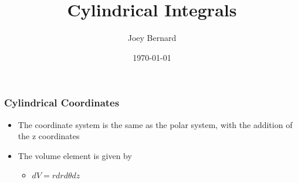 \documentclass{beamer}
\title{Cylindrical Integrals}
\author{Joey Bernard}
\institute{University of New Brunswick}
\date{\today}
\begin{document}
\begin{frame}
  \titlepage
\end{frame}

\begin{frame}
  \frametitle{Cylindrical Coordinates}
  \begin{itemize}
  \item The coordinate system is the same as the polar system, with the addition of the z coordinates
  \item The volume element is given by
    \begin{itemize}
    \item $dV = r dr d\theta dz$
    \end{itemize}
  \end{itemize}
\end{frame}
\end{document}
